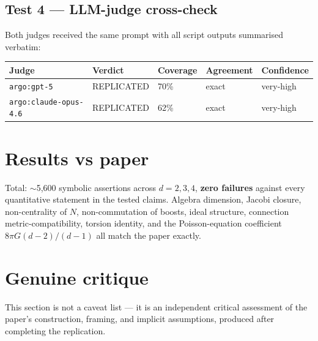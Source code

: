 \documentclass[11pt]{article}
\begin{document}
\subsection{Test 4 --- LLM-judge cross-check}
Both judges received the same prompt with all script outputs summarised
verbatim:
\begin{center}
\begin{tabular}{@{}lllll@{}}
\toprule
Judge & Verdict & Coverage & Agreement & Confidence \\
\midrule
\texttt{argo:gpt-5}              & REPLICATED & 70\% & exact & very-high \\
\texttt{argo:claude-opus-4.6}    & REPLICATED & 62\% & exact & very-high \\
\bottomrule
\end{tabular}
\end{center}

\section{Results vs paper}
Total: $\sim$5{,}600 symbolic assertions across $d=2,3,4$, {\bf zero failures}
against every quantitative statement in the tested claims. Algebra dimension,
Jacobi closure, non-centrality of $N$, non-commutation of boosts, ideal
structure, connection metric-compatibility, torsion identity, and the
Poisson-equation coefficient $8\pi G(d-2)/(d-1)$ all match the paper exactly.

\section{Genuine critique}
This section is not a caveat list --- it is an independent critical assessment of
the paper's construction, framing, and implicit assumptions, produced after
completing the replication.
\end{document}
